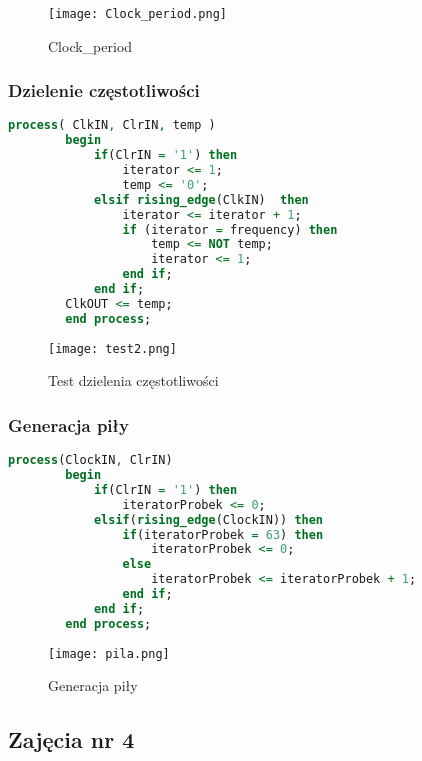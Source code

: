 \documentclass[11pt]{report}
\begin{document}
	\begin{figure}[h]
       	\centering
    	\texttt{[image: Clock\_period.png]}
    	\caption{Clock\_period}
	    \label{fig:ps2}
\end{figure}
\newpage

\subsubsection{Dzielenie częstotliwości}

\begin{lstlisting}[label=Dividing,caption= Dzielenie częstotliwości,frame=tb,language=vhdl]
        process( ClkIN, ClrIN, temp )
        begin
        	if(ClrIN = '1') then 
        		iterator <= 1;
        		temp <= '0';
        	elsif rising_edge(ClkIN)  then
        		iterator <= iterator + 1;
        		if (iterator = frequency) then
        			temp <= NOT temp;
        			iterator <= 1;
        		end if;
        	end if;
        ClkOUT <= temp;
        end process;
    \end{lstlisting}
    
	\begin{figure}[h]
       	\centering
    	\texttt{[image: test2.png]}
    	\caption{Test dzielenia częstotliwości}
	    \label{fig:ps2}
\end{figure}

\subsubsection{Generacja piły}

\begin{lstlisting}[label=saw,caption= Generacja piły,frame=tb,language=vhdl]
        process(ClockIN, ClrIN)
        begin
            if(ClrIN = '1') then
                iteratorProbek <= 0;
            elsif(rising_edge(ClockIN)) then
                if(iteratorProbek = 63) then
                    iteratorProbek <= 0;
                else
                    iteratorProbek <= iteratorProbek + 1;
                end if;
            end if;
        end process;
    \end{lstlisting}
    
	\begin{figure}[h]
       	\centering
    	\texttt{[image: pila.png]}
    	\caption{Generacja piły}
	    \label{fig:ps2}
\end{figure}
\newpage
\subsection{Zajęcia nr 4}
\end{document}
